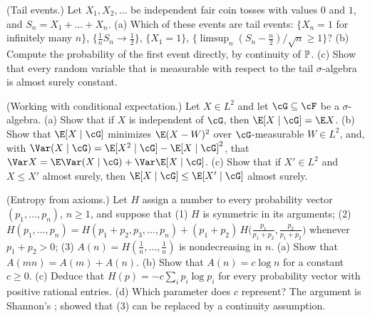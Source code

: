 \begin{refsection}
\begin{exercises}
\item\label{ex:kolmogorov:tail} \consolidation (Tail events.) Let $X_1,X_2,\dots$ be independent fair coin tosses with values $0$ and $1$, and $S_n=X_1+\dots+X_n$. (a) Which of these events are tail events: $\{X_n=1$ for infinitely many $n\}$, $\{\frac1nS_n\to\frac12\}$, $\{X_1=1\}$, $\{\limsup_n(S_n-\frac n2)/\sqrt n\ge1\}$? (b) Compute the probability of the first event directly, by continuity of $\mathbb{P}$. (c) Show that every random variable that is measurable with respect to the tail $\sigma$-algebra is almost surely constant.

\item\label{ex:kolmogorov:condexp} \consolidation (Working with conditional expectation.) Let $X\in L^2$ and let $\cG\subseteq\cF$ be a $\sigma$-algebra. (a) Show that if $X$ is independent of $\cG$, then $\E[X\mid\cG]=\E X$. (b) Show that $\E[X\mid\cG]$ minimizes $\E(X-W)^2$ over $\cG$-measurable $W\in L^2$, and, with $\Var(X\mid\cG)=\E[X^2\mid\cG]-\E[X\mid\cG]^2$, that $\Var X=\E\Var(X\mid\cG)+\Var\E[X\mid\cG]$. (c) Show that if $X'\in L^2$ and $X\le X'$ almost surely, then $\E[X\mid\cG]\le\E[X'\mid\cG]$ almost surely.

\item\label{ex:kolmogorov:entropy} \transfer\hard (Entropy from axioms.) Let $H$ assign a number to every probability vector $(p_1,\dots,p_n)$, $n\ge1$, and suppose that (1) $H$ is symmetric in its arguments; (2) $H(p_1,\dots,p_n)=H(p_1+p_2,p_3,\dots,p_n)+(p_1+p_2)\,H\bigl(\frac{p_1}{p_1+p_2},\frac{p_2}{p_1+p_2}\bigr)$ whenever $p_1+p_2>0$; (3) $A(n)=H(\frac1n,\dots,\frac1n)$ is nondecreasing in $n$. (a) Show that $A(mn)=A(m)+A(n)$. (b) Show that $A(n)=c\log n$ for a constant $c\ge0$. (c) Deduce that $H(p)=-c\sum_ip_i\log p_i$ for every probability vector with positive rational entries. (d) Which parameter does $c$ represent? The argument is Shannon's \parencite{Shannon1948}; \textcite{Faddeev1956} showed that (3) can be replaced by a continuity assumption. 


\end{exercises}
\end{refsection}
